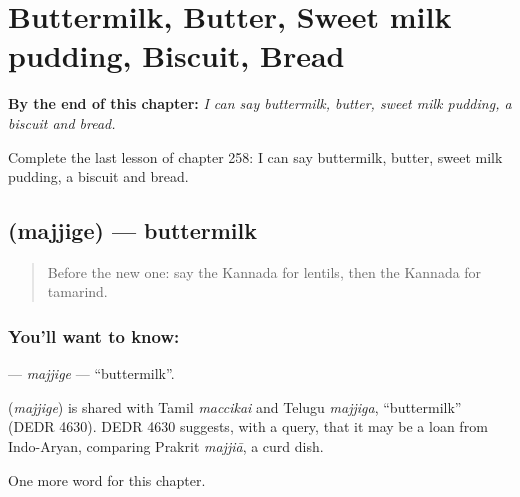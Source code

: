 
\chapter{Buttermilk, Butter, Sweet milk pudding, Biscuit, Bread}
\label{ch:ka-buttermilk-butter-sweet-milk-pudding-biscuit-bread}

\begin{chapteropening}
\textbf{By the end of this chapter:} \emph{I can say buttermilk, butter, sweet milk pudding, a biscuit and bread.}

Complete the last lesson of chapter 258: I can say buttermilk, butter, sweet milk pudding, a biscuit and bread.
\end{chapteropening}

\section[\texorpdfstring{\kn{ಮಜ್ಜಿಗೆ} (majjige)}{ಮಜ್ಜಿಗೆ (majjige)}]{ (majjige) — buttermilk}

\label{lesson:KA-C258-majjige}



\begin{quote}
Before the new one: say the Kannada for lentils, then the Kannada for tamarind.
\end{quote}

\subsection*{You'll want to know: }
\textbf{} — \emph{majjige} — \textquotedblleft{}buttermilk\textquotedblright{}.

\begin{cousinweb}
\textbf{} (\emph{majjige}) is shared with Tamil \emph{maccikai} and Telugu \emph{majjiga}, \textquotedblleft{}buttermilk\textquotedblright{} (DEDR 4630). DEDR 4630 suggests, with a query, that it may be a loan from Indo-Aryan, comparing Prakrit \emph{majjiā}, a curd dish.
\end{cousinweb}

\begin{grammarlens}[title={What you've built}]
One more word for this chapter.
\end{grammarlens}

